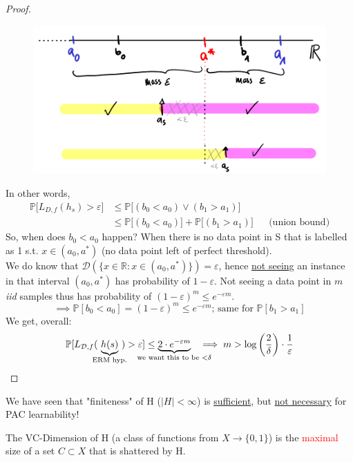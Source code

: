 \documentclass[10pt,a4paper]{article}
\theoremstyle{remark}
\theoremstyle{definition}
\theoremstyle{plain}
\begin{document}
\begin{proof}
	\begin{figure}[H]
		\centering
		\includegraphics[width=0.7\linewidth]{sketch_6}
		\label{fig:sketch6}
	\end{figure}
	
	In other words, 
	\begin{align*}
		\mathbb{P}\big[L_{D,f}(h_s)>\varepsilon\big] 
			&\leq \mathbb{P}\big[(b_0 < a_0) \lor (b_1 > a_1)\big]\\
			&\leq \mathbb{P}\big[ (b_0<a_0) \big] +\mathbb{P}\big[ (b_1 > a_1) \big]
				&& \text{(union bound)}	
	\end{align*}
	So, when does $b_0 < a_0$ happen? When there is no data point in S that is labelled as 1 s.t. $x \in (a_0, a^*)$ (no data point left of perfect threshold).\\
	We do know that $\mathcal{D}(\{x \in \mathbb{R}: x\in (a_0, a^{*})\}) = \varepsilon$, hence \underline{not seeing} an instance in that interval $(a_0, a^*)$ has probability of $1-\varepsilon$. Not seeing a data point in $m$ \textit{iid} samples thus has probability of \underline{$(1-\varepsilon)^m \leq e^{-\varepsilon m}$}.
	$$
		\implies \mathbb{P}[b_0 < a_0] = (1-\varepsilon)^{m} \leq e^{-\varepsilon m} \text{; same for } \mathbb{P}[b_1>a_1]
	$$
	We get, overall:
	$$
		\mathbb{P}[L_{\mathcal{D}, f}(\ \underbrace{h(s)}_{\mathclap{\text{ERM hyp.}}} \ )>\varepsilon] \leq \underbrace{2 \cdot e^{-\varepsilon m}}_{\mathclap{\text{we want this to be } <\delta}} \ \ \implies m > \log\bigg(\frac{2}{\delta}\bigg) \cdot \frac{1}{\varepsilon}
	$$
\end{proof}

We have seen that "finiteness" of H ($|H| < \infty$) is \underline{sufficient}, but \underline{not necessary} for PAC learnability!

\begin{boxeddef}[VC-Dimension]
	The VC-Dimension of H (a class of functions from $X \to \{0,1\}$) is the \textcolor{red}{maximal} size of a set $C \subset X$ that is shattered by H.
\end{boxeddef}
\end{document}
